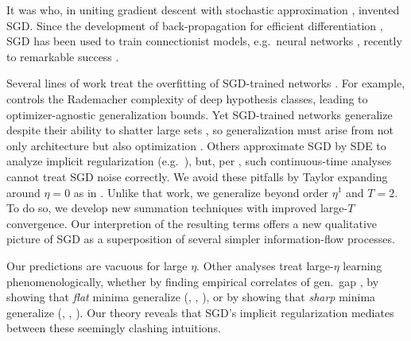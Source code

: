 \documentclass[final,12pt]{colt2021} %
\begin{document}

            It was \cite{ki52} who, in uniting gradient descent \citep{ca47}
            with stochastic approximation \citep{ro51}, invented SGD.  Since
            the development of back-propagation for efficient differentiation
            \citep{we74}, SGD has been used to train connectionist models,
            e.g.\ neural networks \citep{bo91}, recently to remarkable success
            \citep{le15}.
        
        
            Several lines of work treat the overfitting of SGD-trained networks
            \citep{ne17a}.  For example, \cite{ba17} controls the Rademacher
            complexity of deep hypothesis classes, leading to
            optimizer-agnostic generalization bounds.  Yet SGD-trained networks
            generalize despite their ability to shatter large sets
            \citep{zh17}, so generalization must arise from not only
            architecture but also optimization \citep{ne17b}.  Others
            approximate SGD by SDE to analyze implicit regularization (e.g.\
            \cite{ch18}), but, per \cite{ya19a}, such continuous-time analyses
            cannot treat SGD noise correctly.
            We avoid these pitfalls by Taylor expanding around $\eta=0$ as in
            \cite{ro18}.  Unlike that work, we generalize beyond order $\eta^1$
            and $T=2$.  To do so, we develop new summation techniques with
            improved large-$T$ convergence.  Our interpretion of the resulting
            terms offers a new qualitative picture of SGD as a superposition of
            several simpler information-flow processes.
            
        
            Our predictions are vacuous for large $\eta$.  Other analyses treat
            large-$\eta$ learning phenomenologically, whether by finding
            empirical correlates of gen.\ gap \citep{li18}, by showing that
            \emph{flat} minima generalize (\cite{ho17}, \cite{ke17},
            \cite{wa18}), or by showing that \emph{sharp} minima generalize
            (\cite{st56}, \cite{di17}, \cite{wu18}).  Our theory reveals that 
            SGD's implicit regularization mediates between these seemingly
            clashing intuitions.
            
\end{document}
